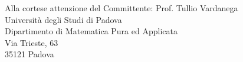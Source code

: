 \documentclass{letter}
\begin{document}
\pagestyle{fancy}
\fancyhf{}
\rhead{
 \slshape \leftmark
}
\date{Padova, 21 Gennaio 2016}
\begin{letter} {
    Alla cortese attenzione del Committente:
    Prof. Tullio Vardanega \\
    Università degli Studi di Padova \\
    Dipartimento di Matematica Pura ed Applicata \\
    Via Trieste, 63 \\
    35121 Padova
  }

  \signature {
    \begin{center}
      \textit{
        Andrea Giacomo Baldan \\
        Responsabile ScalateKids
      }
    \end{center}
  }


\end{letter}
\end{document}
